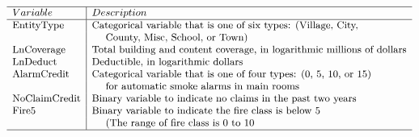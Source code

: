 \documentclass[]{book}
\begin{document}
\[{\small \begin{matrix}
\begin{array}{ l | l}
\hline
Variable    & Description \\
\hline
\text{EntityType}   & \text{Categorical variable that is one of six types:  (Village, City,} \\
& ~~~~ \text{County, Misc, School, or Town)} \\
\text{LnCoverage}   & \text{Total building and content coverage, in logarithmic millions of dollars}\\
\text{LnDeduct}     & \text{Deductible, in logarithmic dollars} \\
\text{AlarmCredit}  & \text{Categorical variable that is one of four types:  (0, 5, 10, or 15)} \\
 &  ~~~~   \text{for automatic smoke alarms in main rooms} \\
\text{NoClaimCredit}    & \text{Binary variable to indicate no claims in the past two years} \\
\text{Fire5 }           & \text{Binary variable to indicate the fire class is below 5} \\
& ~~~~ \text{(The range of fire class is 0 to 10} \\
\hline
\end{array}
\end{matrix}}\]
\end{document}
